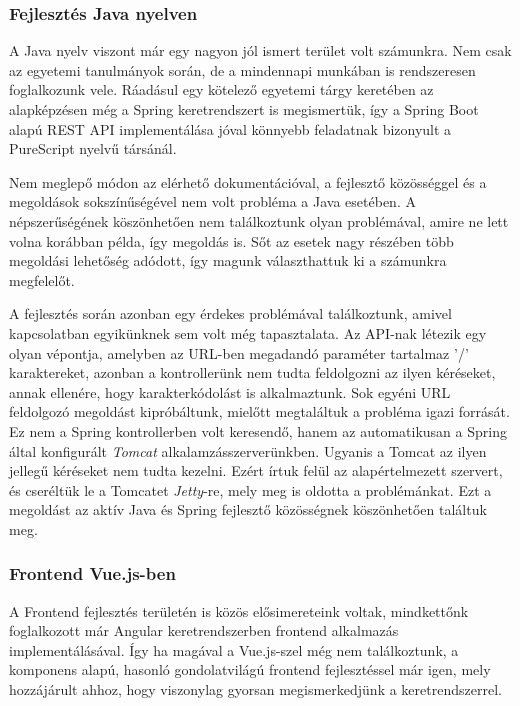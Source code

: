 \documentclass[12pt]{article}
\begin{document}
\subsubsection{Fejlesztés Java nyelven}

A Java nyelv viszont már egy nagyon jól ismert terület volt számunkra. Nem csak az egyetemi tanulmányok során, de a mindennapi munkában is rendszeresen foglalkozunk vele. Ráadásul egy kötelező egyetemi tárgy keretében az alapképzésen még a Spring keretrendszert is megismertük, így a Spring Boot alapú REST API implementálása jóval könnyebb feladatnak bizonyult a PureScript nyelvű társánál.

Nem meglepő módon az elérhető dokumentációval, a fejlesztő közösséggel és a megoldások sokszínűségével nem volt probléma a Java esetében. A népszerűségének köszönhetően nem találkoztunk olyan problémával, amire ne lett volna korábban példa, így megoldás is. Sőt az esetek nagy részében több megoldási lehetőség adódott, így magunk választhattuk ki a számunkra megfelelőt.

A fejlesztés során azonban egy érdekes problémával találkoztunk, amivel kapcsolatban egyikünknek sem volt még tapasztalata. Az API-nak létezik egy olyan vépontja, amelyben az URL-ben megadandó paraméter tartalmaz '/' karaktereket, azonban a kontrollerünk nem tudta feldolgozni az ilyen kéréseket, annak ellenére, hogy karakterkódolást is alkalmaztunk. Sok egyéni URL feldolgozó megoldást kipróbáltunk, mielőtt megtaláltuk a probléma igazi forrását. Ez nem a Spring kontrollerben volt keresendő, hanem az automatikusan a Spring által konfigurált \textit{Tomcat}  alkalamzásszerverünkben. Ugyanis a Tomcat az ilyen jellegű kéréseket nem tudta kezelni. Ezért írtuk felül az alapértelmezett szervert, és cseréltük le a Tomcatet \textit{Jetty}-re, mely meg is oldotta a problémánkat. Ezt a megoldást az aktív Java és Spring fejlesztő közösségnek köszönhetően találtuk meg.

\subsubsection{Frontend Vue.js-ben}

A Frontend fejlesztés területén is közös elősimereteink voltak, mindkettőnk foglalkozott már Angular keretrendszerben frontend alkalmazás implementálásával. Így ha magával a Vue.js-szel még nem találkoztunk, a komponens alapú, hasonló gondolatvilágú frontend fejlesztéssel már igen, mely hozzájárult ahhoz, hogy viszonylag gyorsan megismerkedjünk a keretrendszerrel.
\end{document}
